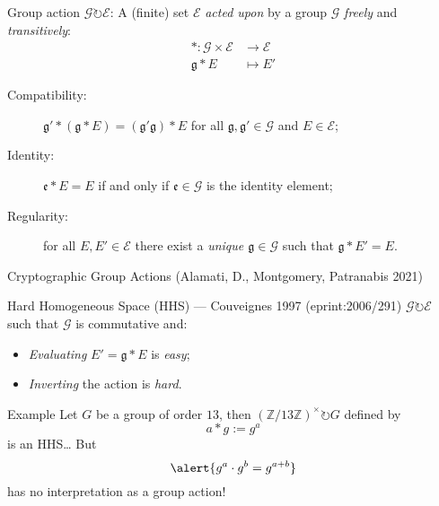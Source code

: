 \documentclass[aspectratio=169]{beamer}
\newcommand{\Z}{ℤ}
\newcommand{\g}{\mathfrak{g}}
\newcommand{\G}{\mathcal{G}}
\newcommand{\E}{\mathcal{E}}
\begin{document}

\begin{frame}
  \begin{block}{Group action}
    \emph{$\G\circlearrowright\E$}: A (finite) set $\E$ \emph{acted
      upon} by a group $\G$ \emph{freely} and \emph{transitively}:
    \begin{align*}
      * : \G × \E &→ \E\\
      \g * E &↦ E'
    \end{align*}
    \par\begin{description}
    \item[Compatibility:] \emph{$\g' * (\g * E) = (\g'\g)*E$} for all
      $\g,\g'\in\G$ and $E\in\E$;
    \item[Identity:] \emph{$\mathfrak{e} * E = E$} if and only if
      $\mathfrak{e}\in\G$ is the identity element;
    \item[Regularity:] for all $E,E'\in\E$ there exist a \emph{unique
        $\g\in\G$} such that \emph{$\g*E'=E$}.
      \setlength{\itemsep}{2em}
    \end{description}
  \end{block}
\end{frame}


\begin{frame}{Cryptographic Group Actions \small(Alamati, D., Montgomery, Patranabis 2021)}
  \begin{block}{Hard Homogeneous Space (HHS) --- Couveignes 1997 \small(eprint:2006/291)}
    \emph{$\G\circlearrowright\E$} such that $\G$ is commutative and:
    \begin{itemize}
    \item \emph{Evaluating} $E' = \g*E$ is \emph{easy};
    \item \emph{Inverting} the action is \emph{hard}.
    \end{itemize}
  \end{block}

  \begin{block}{Example}
    Let $G$ be a group of order $13$, then \emph{$(\Z/13\Z)^\times \circlearrowright G$} defined by
    \[a * g := g^a\]
    is an HHS\dots\pause
    But
    \[\alert{g^a \cdot g^b = g^{a+b}}\]
    has no interpretation as a group action!
  \end{block}
\end{frame}

\end{document}
